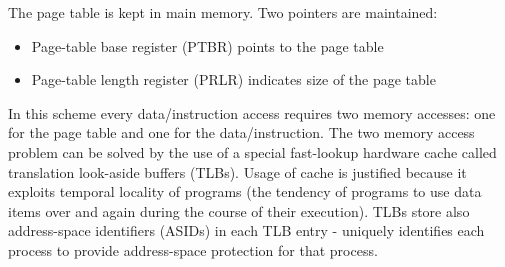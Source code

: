 The page table is kept in main memory. Two pointers are maintained:
\begin{itemize}
    \item Page-table base register (PTBR) points to the page table
    \item Page-table length register (PRLR) indicates size of the page table
\end{itemize}
In this scheme every data/instruction access requires two memory accesses: one for the page table and one for the data/instruction. The two memory access problem can be solved by the use of a special fast-lookup hardware cache called translation look-aside buffers (TLBs). Usage of cache is justified because it exploits temporal locality of programs (the tendency of programs to use data items over and again during the course of their execution). TLBs store also address-space identifiers (ASIDs) in each TLB entry - uniquely identifies each process to provide address-space protection for that process.

